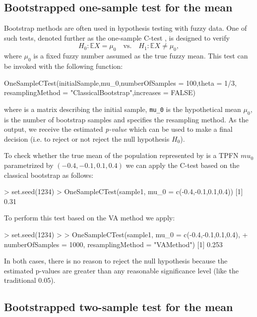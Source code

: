 \subsection{Bootstrapped one-sample test for the mean}

Bootstrap methods are often used in hypothesis testing with fuzzy data.
One of such tests, denoted further as the one-sample C-test \citep{COLUBI2009344,LUBIANO2016918}, is designed to verify
\begin{equation}
\label{h0ctestw}
	H_0 : \mathbb{E} X = \mu_0 \quad\text{vs.}\quad H_1 : \mathbb{E} X \not = \mu_0 ,
\end{equation}
where $\mu_0$ is a fixed fuzzy number assumed as the true fuzzy mean.
This test can be invoked with the following function:
\begin{example}
OneSampleCTest(initialSample,mu_0,numberOfSamples = 100,theta = 1/3,
  resamplingMethod = "ClassicalBootstrap",increases = FALSE)
\end{example}
where  is a matrix describing the initial sample, \verb|mu_0| is the hypothetical mean $\mu_0$,   is the number of bootstrap samples and  specifies the resampling method.
As the output, we receive the estimated \emph{p-value} which can be used to make a final decision (i.e. to reject or not reject the null hypothesis $H_0$).

To check whether the true mean of the population represented by  is a TPFN $mu_0$ parametrized by $(-0.4,-0.1,0.1,0.4)$ we can apply the C-test based on the classical bootstrap as follows:
\begin{example}
> set.seed(1234)
> OneSampleCTest(sample1, mu_0 = c(-0.4,-0.1,0.1,0.4))
[1] 0.31
\end{example}
To perform this test based on the VA method we apply:
\begin{example}
> set.seed(1234)
> 
> OneSampleCTest(sample1, mu_0 = c(-0.4,-0.1,0.1,0.4), 
+                numberOfSamples = 1000, resamplingMethod = "VAMethod")
[1] 0.253
\end{example}
In both cases, there is no reason to reject the null hypothesis because the estimated p-values are greater than any reasonable significance level (like the traditional 0.05).


\subsection{Bootstrapped two-sample test for the mean}


